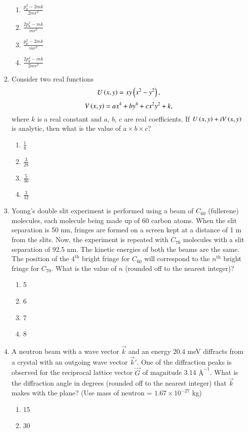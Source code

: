\documentclass[journal]{IEEEtran}
\begin{document}
\begin{enumerate}
\begin{enumerate}
\item $\frac{p_{\theta}^2 - 2mk}{2mr^3}$
\item $\frac{2p_{\theta}^2 - mk}{mr^3}$
\item $\frac{p_{\theta}^2 - 2mk}{mr^3}$
\item $\frac{2p_{\theta}^2 - mk}{2mr^3}$
\end{enumerate}
\item Consider two real functions 
\[
U\left(x, y\right) = x y \left(x^2 - y^2\right),
\]
\[
V\left(x, y\right) = a x^4 + b y^4 + c x^2 y^2 + k,
\]
where $k$ is a real constant and $a$, $b$, $c$ are real coefficients. If $U\left(x, y\right) + i V\left(x, y\right)$ is analytic, then what is the value of $a \times b \times c?$
\begin{enumerate}
\item $\frac{1}{8}$
\item $\frac{3}{28}$
\item $\frac{5}{36}$
\item $\frac{3}{32}$
\end{enumerate}
\item Young’s double slit experiment is performed using a beam of $C_{60}$ (fullerene) molecules, each molecule being made up of 60 carbon atoms. When the slit separation is 50 nm, fringes are formed on a screen kept at a distance of 1 m from the slits. Now, the experiment is repeated with $C_{70}$ molecules with a slit separation of 92.5 nm. The kinetic energies of both the beams are the same. The position of the $4^{\text{th}}$ bright fringe for $C_{60}$ will correspond to the $n^{\text{th}}$ bright fringe for $C_{70}$. What is the value of $n$ (rounded off to the nearest integer)?
\begin{enumerate}
\item 5
\item 6
\item 7
\item 8
\end{enumerate}
\item A neutron beam with a wave vector $\vec{k}$ and an energy 20.4 meV diffracts from a crystal with an outgoing wave vector $\vec{k}'$. One of the diffraction peaks is observed for the reciprocal lattice vector $\vec{G}$ of magnitude 3.14 $Å^{-1}$. What is the diffraction angle in degrees (rounded off to the nearest integer) that $\vec{k}$ makes with the plane? (Use mass of neutron = $1.67 \times 10^{-27}$ kg)\begin{enumerate}
\item 15 
\item 30

\end{enumerate}
\end{enumerate}
\end{document}
